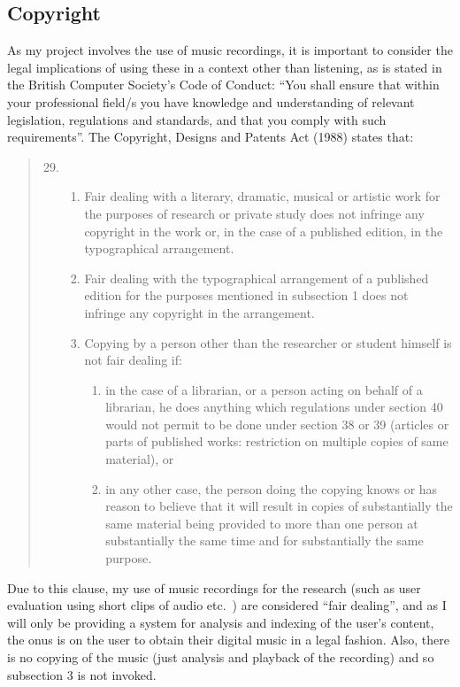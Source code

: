 \subsection{Copyright}
As my project involves the use of music recordings, it is important to consider the legal implications of using these in a context other than listening, as is stated in the British Computer Society's Code of Conduct: ``You shall ensure that within your professional field/s you have knowledge and understanding of relevant legislation, regulations and standards, and that you comply with such requirements''. The Copyright, Designs and Patents Act (1988) states that:
\begin{quotation}
	\renewcommand{\labelenumi}{\arabic{enumi}}
	\renewcommand{\labelenumii}{(\arabic{enumii})}
	\renewcommand{\labelenumiii}{(\alph{enumiii})}
	\begin{enumerate}
	\setcounter{enumi}{28}
		\item \begin{enumerate}
			\item Fair dealing with a literary, dramatic, musical or artistic work for the purposes of research or private study does not infringe any copyright in the work or, in the case of a published edition, in the typographical arrangement.
			\item Fair dealing with the typographical arrangement of a published edition for the purposes mentioned in subsection 1 does not infringe any copyright in the arrangement.
			\item Copying by a person other than the researcher or student himself is not fair dealing if:
			\begin{enumerate}
				\item in the case of a librarian, or a person acting on behalf of a librarian, he does anything which regulations under section 40 would not permit to be done under section 38 or 39 (articles or parts of published works: restriction on multiple copies of same material), or
				\item in any other case, the person doing the copying knows or has reason to believe that it will result in copies of substantially the same material being provided to more than one person at substantially the same time and for substantially the same purpose.
			\end{enumerate}
		\end{enumerate}
	\end{enumerate}
\end{quotation}
Due to this clause, my use of music recordings for the research (such as user
evaluation using short clips of audio etc.\ ) are considered ``fair dealing'', and as I
will only be providing a system for analysis and indexing of the user's content,
the onus is on the user to obtain their digital music in a legal fashion. Also, there is no copying of the music (just analysis and playback of the recording)
and so subsection 3 is not invoked.

